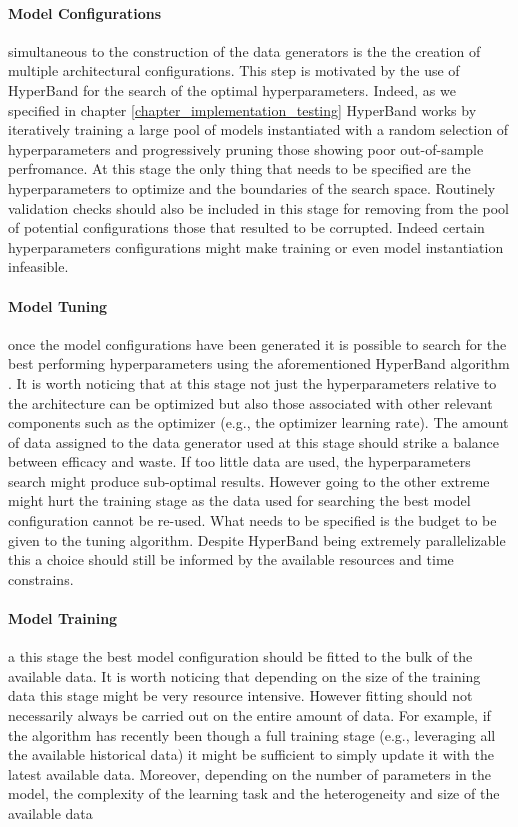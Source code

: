 \paragraph*{Model Configurations} simultaneous to the construction of the data generators is the the creation of multiple architectural configurations. This step is motivated by the use of HyperBand \cite{li2017hyperband} for the search of the optimal hyperparameters. Indeed, as we specified in chapter \ref{chapter_implementation_testing} HyperBand works by iteratively training a large pool of models instantiated with a random selection of hyperparameters and progressively pruning those showing poor out-of-sample perfromance. At this stage the only thing that needs to be specified are the hyperparameters to optimize and the boundaries of the search space. Routinely validation checks should also be included in this stage for removing from the pool of potential configurations those that resulted to be corrupted. Indeed certain hyperparameters configurations might make training or even model instantiation infeasible.

\paragraph*{Model Tuning} once the model configurations have been generated it is possible to search for the best performing hyperparameters using the aforementioned HyperBand algorithm \cite{li2017hyperband}. It is worth noticing that at this stage not just the hyperparameters relative to the architecture can be optimized but also those associated with other relevant components such as the optimizer (e.g., the optimizer learning rate). The amount of data assigned to the data generator used at this stage should strike a balance between efficacy and waste. If too little data are used, the hyperparameters search might produce sub-optimal results. However going to the other extreme might hurt the training stage as the data used for searching the best model configuration cannot be re-used. What needs to be specified is the budget to be given to the tuning algorithm. Despite HyperBand being extremely parallelizable \cite{li2017hyperband} this a choice should still be informed by the available resources and time constrains.

\paragraph*{Model Training} a this stage the best model configuration should be fitted to the bulk of the available data. It is worth noticing that depending on the size of the training data this stage might be very resource intensive. However fitting should not necessarily always be carried out on the entire amount of data. For example, if the algorithm has recently been though a full training stage (e.g., leveraging all the available historical data) it might be sufficient to simply update it with the latest available data. Moreover, depending on the number of parameters in the model, the complexity of the learning task and the heterogeneity and size of the available data 

